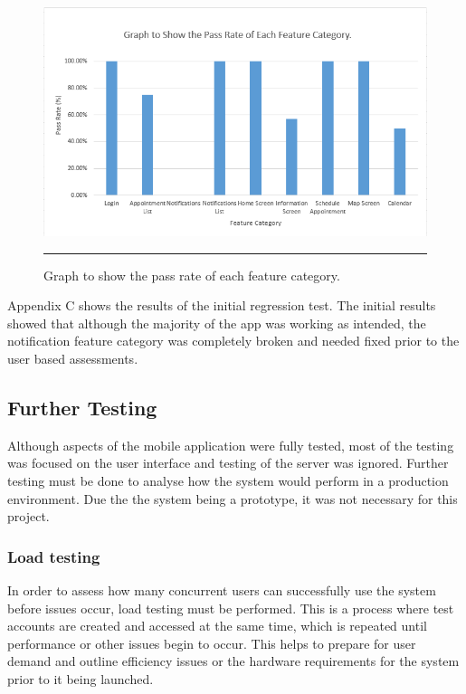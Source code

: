 \begin{figure}[htbp]
	\centering
		\includegraphics[width=\textwidth,height=\textheight,keepaspectratio]{Figures/FunctionalTestResults.png}
		\rule{35em}{0.5pt}
		\caption[Graph to show the pass rate of each feature category.]{Graph to show the pass rate of each feature category.}
	\label{fig:functionaltestresults}
\end{figure}

Appendix C shows the results of the initial regression test. The initial results showed that although the majority of the app was working as intended, the notification feature category was completely broken and needed fixed prior to the user based assessments.

\subsection{Further Testing}

Although aspects of the mobile application were fully tested, most of the testing was focused on the user interface and testing of the server was ignored. Further testing must be done to analyse how the system would perform in a production environment. Due the the system being a prototype, it was not necessary for this project.

\subsubsection{Load testing}

In order to assess how many concurrent users can successfully use the system before issues occur, load testing must be performed. This is a process where test accounts are created and accessed at the same time, which is repeated until performance  or other issues begin to occur. This helps to prepare for user demand and outline efficiency issues or the hardware requirements for the system prior to it being launched.

